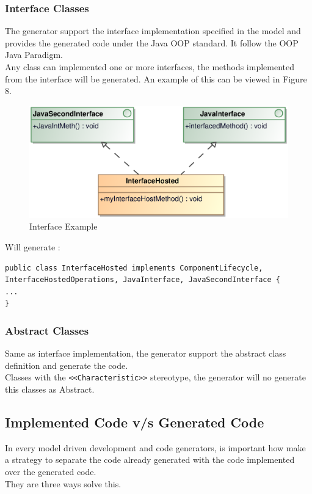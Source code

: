 \subsubsection{Interface Classes}
The generator support the interface implementation specified in the model and
provides the generated code under the Java OOP standard. It follow the OOP Java
Paradigm.\\
Any class can implemented one or more interfaces, the methods implemented from
the interface will be generated.
An example of this can be viewed in Figure 8.
\begin{figure}[h!t]
\begin{center}
\includegraphics[scale=0.6]{images/interface}
\caption{\label{fig:vs_diag}Interface Example}
\end{center}
\end{figure}

Will generate :
\begin{verbatim}
public class InterfaceHosted implements ComponentLifecycle,
InterfaceHostedOperations, JavaInterface, JavaSecondInterface {
...
}
\end{verbatim}

\subsubsection{Abstract Classes}
Same as interface implementation, the generator support the abstract class
definition and generate the code.\\
Classes with the \verb+<<Characteristic>>+ stereotype, the generator will no
generate this classes as Abstract.

\subsection{Implemented Code v/s Generated Code}
In every model driven development and code generators, is important how make a
strategy to separate the code already generated with the code implemented over
the generated code.\\
They are three ways solve this.


